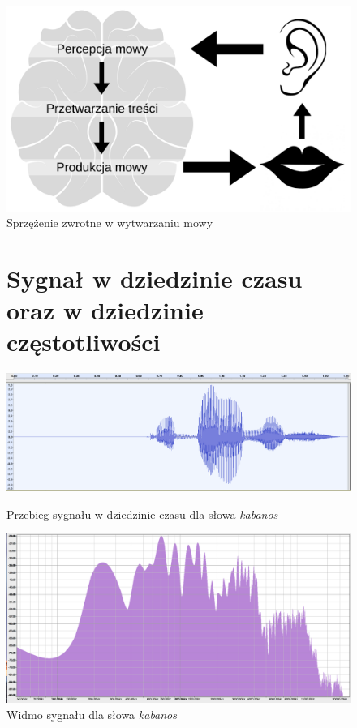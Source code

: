 \documentclass[eng,printmode]{mgr}
\begin{document}
\begin{figure}
	 \begin{center}
	 	\includegraphics[scale=0.25]{feedback.png}
	 	\caption{Sprzężenie zwrotne w wytwarzaniu mowy} 	
	 \end{center}
 \end{figure}
 
\begin{figure}
 	\section{Sygnał w dziedzinie czasu oraz w dziedzinie częstotliwości}
 	\begin{center}
 		\includegraphics[scale=0.3]{kabanosTime.png}
 		\caption{Przebieg sygnału w dziedzinie czasu dla słowa \emph{kabanos}}\vspace{5mm}
 		
 		\includegraphics[scale=0.5]{kabanosSpectrum.png}
 		\caption{Widmo sygnału dla słowa \emph{kabanos}}\vspace{5mm}
 	\end{center}
\end{figure}
  
\end{document}
